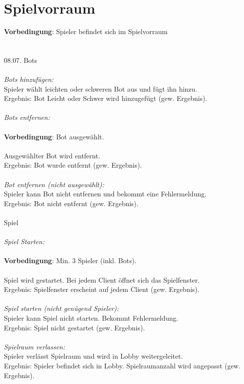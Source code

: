 \documentclass[10pt]{report}
\begin{document}
	\chapter{Spielvorraum}
		\textbf{Vorbedingung}: Spieler befindet sich im Spielvorraum \\
		\\
		\\08.07. Bots \\
		\\
		\textsl{Bots hinzuf\"ugen:} \\
		Spieler w\"ahlt leichten oder schweren Bot aus und f\"ugt ihn hinzu. \\
		Ergebnis: Bot Leicht oder Schwer wird hinzugef\"ugt (gew. Ergebnis). \\
		\\
		\textsl{Bots entfernen:} \\
		\\
		\textbf{Vorbedingung}: Bot ausgew\"ahlt. \\
		\\
		Ausgew\"ahlter Bot wird entfernt. \\
		Ergebnis: Bot wurde entfernt (gew. Ergebnis). \\
		\\
		\textsl{Bot entfernen (nicht ausgew\"ahlt):} \\
		Spieler kann Bot nicht entfernen und bekommt eine Fehlermeldung. \\
		Ergebnis: Bot nicht entfernt (gew. Ergebnis). \\
		\\
		Spiel \\
		\\ 
		\textsl{Spiel Starten:} \\
		\\
		\textbf{Vorbedingung}: Min. 3 Spieler (inkl. Bots). \\
		\\
		Spiel wird gestartet. Bei jedem Client \"offnet sich das Spielfenster. \\
		Ergebnis: Spielfenster erscheint auf jedem Client (gew. Ergebnis). \\
		\\
		\textsl{Spiel starten (nicht gen\"ugend Spieler):} \\
		Spieler kann Spiel nicht starten. Bekommt Fehlermeldung. \\
		Ergebnis: Spiel nicht gestartet (gew. Ergebnis). \\
		\\
		\textsl{Spielraum verlassen:}  \\
		Spieler verl\"asst Spielraum und wird in Lobby weitergeleitet. \\
		Ergebnis: Spieler befindet sich in Lobby. Spielraumanzahl wird angepasst (gew. Ergebnis). \\
		\\
		
\end{document}
